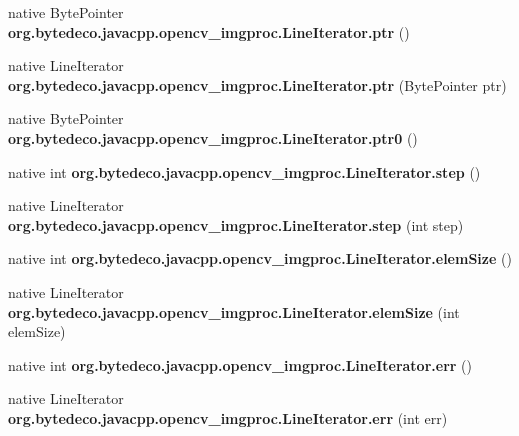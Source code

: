 \begin{DoxyCompactItemize}
\mbox{\label{group__imgproc_ga25dc6ab71b5b93e0a3413227e2773826}} 
native Byte\+Pointer {\bfseries org.\+bytedeco.\+javacpp.\+opencv\+\_\+imgproc.\+Line\+Iterator.\+ptr} ()
\item 
\mbox{\label{group__imgproc_ga20f9ec09fb3f6f6ccf40193b347d0f7c}} 
native Line\+Iterator {\bfseries org.\+bytedeco.\+javacpp.\+opencv\+\_\+imgproc.\+Line\+Iterator.\+ptr} (Byte\+Pointer ptr)
\item 
\mbox{\label{group__imgproc_gad943660786a5905e1c46f535e955ef7c}} 
native Byte\+Pointer {\bfseries org.\+bytedeco.\+javacpp.\+opencv\+\_\+imgproc.\+Line\+Iterator.\+ptr0} ()
\item 
\mbox{\label{group__imgproc_gac4e82c4106fb6c949cc7b8beeedc3fe6}} 
native int {\bfseries org.\+bytedeco.\+javacpp.\+opencv\+\_\+imgproc.\+Line\+Iterator.\+step} ()
\item 
\mbox{\label{group__imgproc_ga37f140e72ae2e2263e885394b9f9b34b}} 
native Line\+Iterator {\bfseries org.\+bytedeco.\+javacpp.\+opencv\+\_\+imgproc.\+Line\+Iterator.\+step} (int step)
\item 
\mbox{\label{group__imgproc_gaaa21dc13f40e52f18c1beb09d4d617c0}} 
native int {\bfseries org.\+bytedeco.\+javacpp.\+opencv\+\_\+imgproc.\+Line\+Iterator.\+elem\+Size} ()
\item 
\mbox{\label{group__imgproc_ga00feb3c069b4b6e78be703a6b308ebe7}} 
native Line\+Iterator {\bfseries org.\+bytedeco.\+javacpp.\+opencv\+\_\+imgproc.\+Line\+Iterator.\+elem\+Size} (int elem\+Size)
\item 
\mbox{\label{group__imgproc_ga4a719006f4c64889fd7070f4ec6e4792}} 
native int {\bfseries org.\+bytedeco.\+javacpp.\+opencv\+\_\+imgproc.\+Line\+Iterator.\+err} ()
\item 
\mbox{\label{group__imgproc_ga2d7994d73929a584f419f6904938e3b8}} 
native Line\+Iterator {\bfseries org.\+bytedeco.\+javacpp.\+opencv\+\_\+imgproc.\+Line\+Iterator.\+err} (int err)
\item 
\mbox{\label{group__imgproc_ga02a146e333c11cdc62f4e43abb88a287}} 

\end{DoxyCompactItemize}
